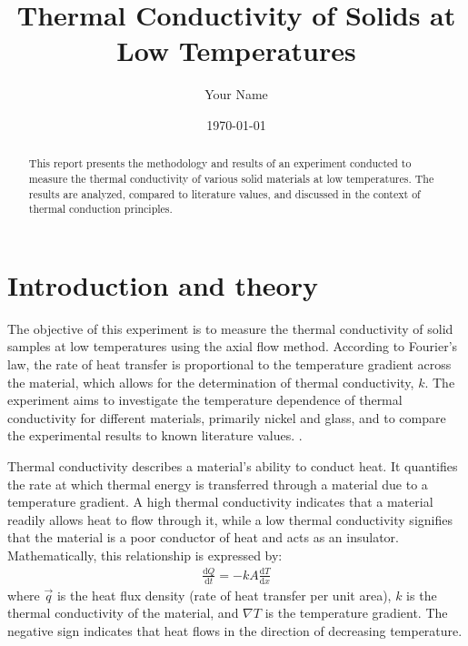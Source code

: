 \documentclass[a4paper,12pt]{article}
\title{Thermal Conductivity of Solids at Low Temperatures}
\author{Your Name}
\date{\today}
\begin{document}
\maketitle
\begin{abstract}
    This report presents the methodology and results of an experiment conducted to measure the thermal conductivity of various solid materials at low temperatures. The results are analyzed, compared to literature values, and discussed in the context of thermal conduction principles.
\end{abstract}
\newpage


\section{Introduction and theory}
\label{sec:introduction}
The objective of this experiment is to measure the thermal conductivity of solid samples at low temperatures using the axial flow method. According to Fourier's law, the rate of heat transfer is proportional to the temperature gradient across the material, which allows for the determination of thermal conductivity, \( k \). The experiment aims to investigate the temperature dependence of thermal conductivity for different materials, primarily nickel and glass, and to compare the experimental results to known literature values. \autocite{example1}. \par
Thermal conductivity describes a material's ability to conduct heat. It quantifies the rate at which thermal energy is transferred through a material due to a temperature gradient. A high thermal conductivity indicates that a material readily allows heat to flow through it, while a low thermal conductivity signifies that the material is a poor conductor of heat and acts as an insulator. Mathematically, this relationship is expressed by:
\begin{align}
\frac{ \mathrm{ d } Q }{ \mathrm{ d } t } = -kA\frac{ \mathrm{ d } T }{ \mathrm{ d } x }
\end{align}
where $\vec{q}$ is the heat flux density (rate of heat transfer per unit area), $k$ is the thermal conductivity of the material, and $\nabla T$ is the temperature gradient. The negative sign indicates that heat flows in the direction of decreasing temperature.
\end{document}
